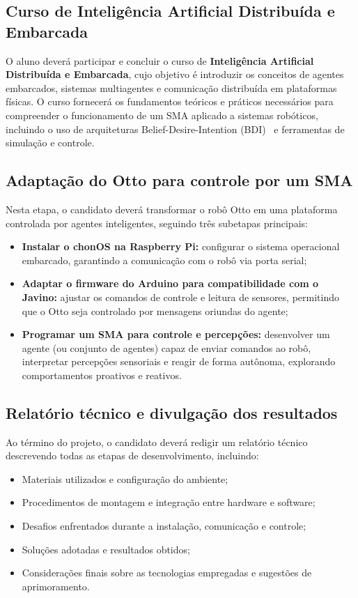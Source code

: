 \documentclass{ieeeojies}
\begin{document}
\subsection{Curso de Inteligência Artificial Distribuída e Embarcada}

O aluno deverá participar e concluir o curso de \textbf{Inteligência Artificial Distribuída e Embarcada}, cujo objetivo é introduzir os conceitos de agentes embarcados, sistemas multiagentes e comunicação distribuída em plataformas físicas. O curso fornecerá os fundamentos teóricos e práticos necessários para compreender o funcionamento de um SMA aplicado a sistemas robóticos, incluindo o uso de arquiteturas Belief-Desire-Intention (BDI)~\cite{Bratman1987} e ferramentas de simulação e controle.

\subsection{Adaptação do Otto para controle por um SMA}

Nesta etapa, o candidato deverá transformar o robô Otto em uma plataforma controlada por agentes inteligentes, seguindo três subetapas principais:
\begin{itemize}
    \item \textbf{Instalar o chonOS na Raspberry Pi:} configurar o sistema operacional embarcado, garantindo a comunicação com o robô via porta serial;
    \item \textbf{Adaptar o firmware do Arduino para compatibilidade com o Javino:} ajustar os comandos de controle e leitura de sensores, permitindo que o Otto seja controlado por mensagens oriundas do agente;
    \item \textbf{Programar um SMA para controle e percepções:} desenvolver um agente (ou conjunto de agentes) capaz de enviar comandos ao robô, interpretar percepções sensoriais e reagir de forma autônoma, explorando comportamentos proativos e reativos.
\end{itemize}

\subsection{Relatório técnico e divulgação dos resultados}

Ao término do projeto, o candidato deverá redigir um relatório técnico descrevendo todas as etapas de desenvolvimento, incluindo:
\begin{itemize}
    \item Materiais utilizados e configuração do ambiente;
    \item Procedimentos de montagem e integração entre hardware e software;
    \item Desafios enfrentados durante a instalação, comunicação e controle;
    \item Soluções adotadas e resultados obtidos;
    \item Considerações finais sobre as tecnologias empregadas e sugestões de aprimoramento.
\end{itemize}
\end{document}

